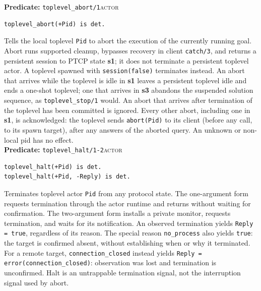 \noindent \textbf{Predicate:} \texttt{toplevel\_\allowbreak{}abort/\allowbreak{}1}\hfill\textsc{actor}

\begin{verbatim}
toplevel_abort(+Pid) is det.
\end{verbatim}

\noindent Tells the local toplevel \texttt{Pid} to abort the execution of the
currently running goal. Abort runs supported cleanup, bypasses recovery in
client \texttt{catch/\allowbreak{}3}, and returns a persistent session to PTCP state \textbf{s1}; it does not terminate a persistent toplevel actor. A toplevel spawned with \texttt{session(\allowbreak{}false)} terminates instead. An abort that arrives while the toplevel is idle in \textbf{s1} leaves a persistent toplevel idle and ends a one-shot toplevel; one that arrives in \textbf{s3} abandons the suspended solution sequence, as \texttt{toplevel\_\allowbreak{}stop/\allowbreak{}1} would. An abort that arrives after termination of the toplevel has been committed is ignored. Every other abort, including one in \textbf{s1}, is acknowledged: the toplevel sends \texttt{abort(\allowbreak{}Pid)} to its client (before any call, to its spawn target), after any answers of the aborted query. An unknown or non-local pid has no effect.\\


\noindent \textbf{Predicate:} \texttt{toplevel\_\allowbreak{}halt/\allowbreak{}1-2}\hfill\textsc{actor}

\begin{verbatim}
toplevel_halt(+Pid) is det.
toplevel_halt(+Pid, -Reply) is det.
\end{verbatim}

\noindent Terminates toplevel actor \texttt{Pid} from any protocol state.
The one-argument form requests termination through the actor runtime and
returns without waiting for confirmation. The two-argument form installs a
private monitor, requests termination, and waits for its notification.
An observed termination yields \texttt{Reply = true}, regardless of its
reason. The special reason \texttt{no\_\allowbreak{}process} also yields \texttt{true}: the
target is confirmed absent, without establishing when or why it terminated.
For a remote target, \texttt{connection\_\allowbreak{}closed} instead yields
\texttt{Reply = error(\allowbreak{}connection\_\allowbreak{}closed)}: observation was lost and
termination is unconfirmed. Halt is an
untrappable termination signal, not the interruption signal used by abort.


